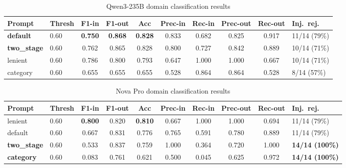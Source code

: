 
\usepackage{booktabs}
\usepackage{array}
\usepackage{makecell}


\begin{table}[ht]
\centering
\caption{Qwen3-235B domain classification results}
\label{tab:qwen3-results}
\begin{tabular}{llcccccccl}
\toprule
Prompt & Thresh & F1-in & F1-out & Acc & Prec-in & Rec-in & Prec-out & Rec-out & Inj.\ rej. \\
\midrule
\textbf{default}    & 0.60 & \textbf{0.750} & \textbf{0.868} & \textbf{0.828} & 0.833 & 0.682 & 0.825 & 0.917 & 11/14 (79\%) \\
\textbf{two\_stage} & 0.60 & 0.762 & 0.865 & 0.828 & 0.800 & 0.727 & 0.842 & 0.889 & 10/14 (71\%) \\
lenient             & 0.60 & 0.786 & 0.800 & 0.793 & 0.647 & 1.000 & 1.000 & 0.667 & 10/14 (71\%) \\
category            & 0.60 & 0.655 & 0.655 & 0.655 & 0.528 & 0.864 & 0.864 & 0.528 & 8/14 (57\%) \\
\bottomrule
\end{tabular}
\end{table}



\begin{table}[ht]
\centering
\caption{Nova Pro domain classification results}
\label{tab:nova-pro-results}
\begin{tabular}{llcccccccl}
\toprule
Prompt & Thresh & F1-in & F1-out & Acc & Prec-in & Rec-in & Prec-out & Rec-out & Inj.\ rej. \\
\midrule
lenient              & 0.60 & \textbf{0.800} & 0.820 & \textbf{0.810} & 0.667 & 1.000 & 1.000 & 0.694 & 11/14 (79\%) \\
default              & 0.60 & 0.667 & 0.831 & 0.776 & 0.765 & 0.591 & 0.780 & 0.889 & 11/14 (79\%) \\
\textbf{two\_stage}  & 0.60 & 0.533 & 0.837 & 0.759 & 1.000 & 0.364 & 0.720 & 1.000 & \textbf{14/14 (100\%)} \\
\textbf{category}    & 0.60 & 0.083 & 0.761 & 0.621 & 0.500 & 0.045 & 0.625 & 0.972 & \textbf{14/14 (100\%)} \\
\bottomrule
\end{tabular}
\end{table}



